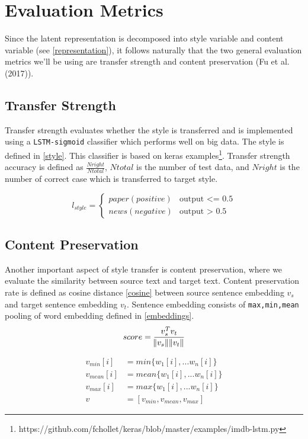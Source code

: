 \documentclass{article}
\begin{document}
\section{Evaluation Metrics}
\label{eval}
Since the latent representation is decomposed into style variable and content variable (see \ref{representation}), it follows naturally that the two general evaluation metrics we'll be using are transfer strength and content preservation (Fu et al.(2017)).

\subsection{Transfer Strength}
Transfer strength evaluates whether the style is transferred and is implemented using a \texttt{LSTM-sigmoid} classifier which performs well on big data. The style is defined in \ref{style}. This classifier is based on keras examples\footnote{
https://github.com/fchollet/keras/blob/master/examples/imdb-lstm.py}. Transfer strength accuracy is defined as $\frac{Nright}{Ntotal}$, $Ntotal$ is the number of test data, and $Nright$ is the number of correct case which
is transferred to target style.

\begin{equation}
\label{style}
  l_{style} =
    \begin{cases}
      paper(positive) & \text{output <= 0.5}\\
      news(negative) & \text{output > 0.5}
    \end{cases}       
\end{equation}

\subsection{Content Preservation}
Another important aspect of style transfer is content preservation, where we evaluate the similarity between source text and target text. Content preservation rate is defined as cosine distance \ref{cosine} between source sentence embedding $v_s$ and target sentence embedding $v_t$. Sentence embedding consists of \texttt{max,min,mean} pooling of word embedding defined in \ref{embeddings}.
\label{cosine}
\begin{equation}
    score = \frac{v_{s}^T v_{t}}{\norm{v_s}\norm{v_t}}
\end{equation}

\label{embeddings}
\begin{equation}
\begin{aligned}
    v_{min}[i] & = min\{w_1[i], ... w_n[i]\} \\
    v_{mean}[i] & = mean\{w_1[i], ... w_n[i]\} \\
    v_{max}[i] & = max\{w_1[i], ... w_n[i]\} \\
    v & = [v_{min}, v_{mean}, v_{max}]
\end{aligned}
\end{equation}
\end{document}
